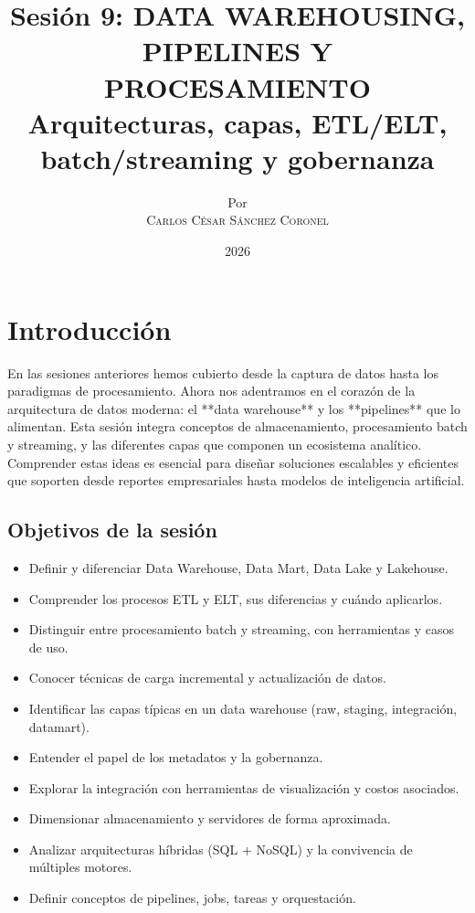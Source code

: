 \documentclass[12pt,a4paper,openany,oneside]{book}
\title{
    \Huge \textbf{Sesión 9: DATA WAREHOUSING, PIPELINES Y PROCESAMIENTO} \\
    \large Arquitecturas, capas, ETL/ELT, batch/streaming y gobernanza
}
\author{
    \small Por \\ \vspace{0.2cm}
    \Large \textsc{Carlos César Sánchez Coronel}
}
\date{2026}
\begin{document}
\maketitle

\tableofcontents
{}

\chapter{Introducción}
En las sesiones anteriores hemos cubierto desde la captura de datos hasta los paradigmas de procesamiento. Ahora nos adentramos en el corazón de la arquitectura de datos moderna: el **data warehouse** y los **pipelines** que lo alimentan. Esta sesión integra conceptos de almacenamiento, procesamiento batch y streaming, y las diferentes capas que componen un ecosistema analítico. Comprender estas ideas es esencial para diseñar soluciones escalables y eficientes que soporten desde reportes empresariales hasta modelos de inteligencia artificial.

\section{Objetivos de la sesión}
\begin{itemize}
    \item Definir y diferenciar Data Warehouse, Data Mart, Data Lake y Lakehouse.
    \item Comprender los procesos ETL y ELT, sus diferencias y cuándo aplicarlos.
    \item Distinguir entre procesamiento batch y streaming, con herramientas y casos de uso.
    \item Conocer técnicas de carga incremental y actualización de datos.
    \item Identificar las capas típicas en un data warehouse (raw, staging, integración, datamart).
    \item Entender el papel de los metadatos y la gobernanza.
    \item Explorar la integración con herramientas de visualización y costos asociados.
    \item Dimensionar almacenamiento y servidores de forma aproximada.
    \item Analizar arquitecturas híbridas (SQL + NoSQL) y la convivencia de múltiples motores.
    \item Definir conceptos de pipelines, jobs, tareas y orquestación.
\end{itemize}
\end{document}
